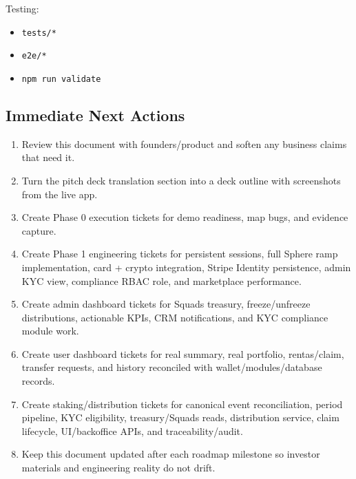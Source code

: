 \documentclass[
  10pt,
  letterpaper,
]{article}
\providecommand{\tightlist}{%
  \setlength{\itemsep}{0pt}\setlength{\parskip}{0pt}}
\let\oldtexttt\texttt
\renewcommand{\texttt}[1]{\oldtexttt{\small #1}}
\begin{document}
Testing:

\begin{itemize}
\tightlist
\item
  \texttt{tests/*}
\item
  \texttt{e2e/*}
\item
  \texttt{npm\ run\ validate}
\end{itemize}

\subsection{Immediate Next Actions}\label{immediate-next-actions}

\begin{enumerate}
\def\labelenumi{\arabic{enumi}.}
\tightlist
\item
  Review this document with founders/product and soften any business
  claims that need it.
\item
  Turn the pitch deck translation section into a deck outline with
  screenshots from the live app.
\item
  Create Phase 0 execution tickets for demo readiness, map bugs, and
  evidence capture.
\item
  Create Phase 1 engineering tickets for persistent sessions, full
  Sphere ramp implementation, card + crypto integration, Stripe Identity
  persistence, admin KYC view, compliance RBAC role, and marketplace
  performance.
\item
  Create admin dashboard tickets for Squads treasury, freeze/unfreeze
  distributions, actionable KPIs, CRM notifications, and KYC compliance
  module work.
\item
  Create user dashboard tickets for real summary, real portfolio,
  rentas/claim, transfer requests, and history reconciled with
  wallet/modules/database records.
\item
  Create staking/distribution tickets for canonical event
  reconciliation, period pipeline, KYC eligibility, treasury/Squads
  reads, distribution service, claim lifecycle, UI/backoffice APIs, and
  traceability/audit.
\item
  Keep this document updated after each roadmap milestone so investor
  materials and engineering reality do not drift.
\end{enumerate}
\end{document}
